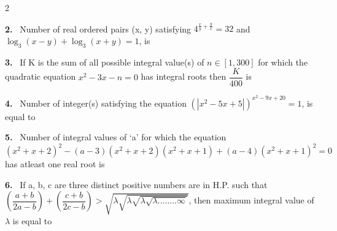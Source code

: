 \documentclass[10pt]{extarticle}
\newcommand{\qn}[1]{\par\smallskip\noindent\textbf{#1.}~}
\begin{document}
\begin{multicols}{2}
\qn{2} Number of real ordered pairs (x, y) satisfying $4^{\frac xy+\frac yx}=32$ and $\log_3(x-y)+\log_3(x+y)=1$, is
\qn{3} If K is the sum of all possible integral value(s) of $n\in[1,300]$ for which the quadratic equation $x^2-3x-n=0$ has integral roots then $\dfrac K{400}$ is
\qn{4} Number of integer(s) satisfying the equation $\left(\left|x^2-5x+5\right|\right)^{x^2-9x+20}=1$, is equal to
\qn{5} Number of integral values of `a' for which the equation $(x^2+x+2)^2-(a-3)(x^2+x+2)(x^2+x+1)+(a-4)(x^2+x+1)^2=0$ has atleast one real root is
\qn{6} If a, b, c are three distinct positive numbers are in H.P. such that $\left(\dfrac{a+b}{2a-b}\right)+\left(\dfrac{c+b}{2c-b}\right)>\sqrt{\lambda\sqrt{\lambda\sqrt{\lambda\sqrt{\lambda........\infty}}}}$, then maximum integral value of $\lambda$ is equal to
\end{multicols}
\end{document}
